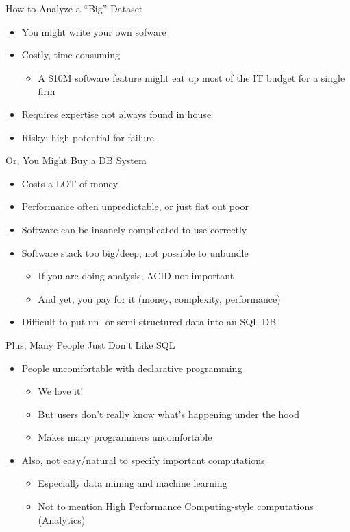 \documentclass[aspectratio=169]{beamer}
\begin{document}
\begin{frame}{How to Analyze a ``Big'' Dataset}

\begin{itemize}
\item You might write your own sofware
\item Costly, time consuming
        \begin{itemize}
        \item A \$10M software feature might eat up most of the IT budget for a single firm
        \end{itemize}
\item Requires expertise not always found in house
\item Risky: high potential for failure
\end{itemize}
\end{frame}
\begin{frame}{Or, You Might Buy a DB System}

\begin{itemize}
\item Costs a LOT of money
\item Performance often unpredictable, or just flat out poor
\item Software can be insanely complicated to use correctly
\item Software stack too big/deep, not possible to unbundle
	\begin{itemize}
	\item If you are doing analysis, ACID not important
	\item And yet, you pay for it (money, complexity, performance)
	\end{itemize}
\item Difficult to put un- or semi-structured data into an SQL DB
\end{itemize}

\end{frame}
\begin{frame}{Plus, Many People Just Don't Like SQL}

\begin{itemize}
\item People uncomfortable with declarative programming
        \begin{itemize}
        \item We love it!
	\item But users don't really know what's happening under the hood
	\item Makes many programmers uncomfortable
        \end{itemize}
\item Also, not easy/natural to specify important computations
        \begin{itemize}
        \item Especially data mining and machine learning
	\item Not to mention High Performance Computing-style computations  (Analytics)
        \end{itemize}
\end{itemize}
\end{frame}
\end{document}
